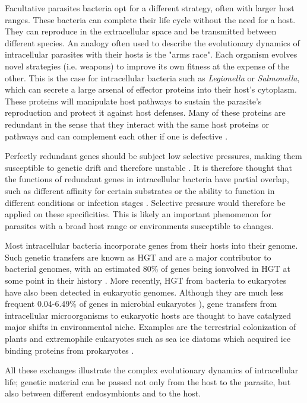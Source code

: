 Facultative parasites bacteria opt for a different strategy, often with larger host ranges. These bacteria can complete their life cycle without the need for a host. They can reproduce in the extracellular space and be transmitted between different species. An analogy often used to describe the evolutionary dynamics of intracellular parasites with their hosts is the "arms race". Each organism evolves novel strategies (i.e. weapons) to improve its own fitness at the expense of the other. This is the case for intracellular bacteria such as \textit{Legionella} or \textit{Salmonella}, which can secrete a large arsenal of effector proteins into their host's cytoplasm. These proteins will manipulate host pathways to sustain the parasite's reproduction and protect it against host defenses. Many of these proteins are redundant in the sense that they interact with the same host proteins or pathways and can complement each other if one is defective \cite{Ghosh2017}.

Perfectly redundant genes should be subject low selective pressures, making them susceptible to genetic drift and therefore unstable \cite{Bergthorsson2007}. It is therefore thought that the functions of redundant genes in intracellular bacteria have partial overlap, such as different affinity for certain substrates or the ability to function in different conditions or infection stages \cite{Ghosh2017}. Selective pressure would therefore be applied on these specificities. This is likely an important phenomenon for parasites with a broad host range or environments susceptible to changes.

Most intracellular bacteria incorporate genes from their hosts into their genome. Such genetic transfers are known as \acrfull{HGT} and are a major contributor to bacterial genomes, with an estimated 80\% of genes being ionvolved in HGT at some point in their history \cite{Dagan2008}. More recently, HGT from bacteria to eukaryotes have also been detected in eukaryotic genomes. Although they are much less frequent 0.04-6.49\% of genes in microbial eukaryotes \cite{VanEtten2020}), gene transfers from intracellular microorganisms to eukaryotic hosts are thought to have catalyzed major shifts in environmental niche. Examples are the terrestrial colonization of plants and extremophile eukaryotes such as sea ice diatoms which acquired ice binding proteins from prokaryotes \cite{VanEtten2020}.

All these exchanges illustrate the complex evolutionary dynamics of intracellular life; genetic material can be passed not only from the host to the parasite, but also between different endosymbionts and to the host.

